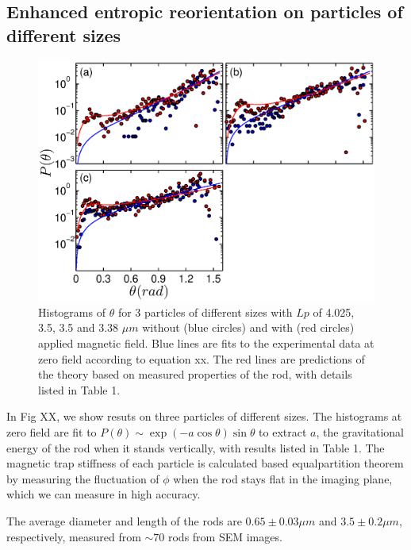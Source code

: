 \documentclass[aps,prl, twocolumn,groupedaddress]{revtex4}
\begin{document}
\subsection*{\normalsize Enhanced entropic reorientation on particles of different sizes}
\begin{figure}[!ht]
\begin{center}
\includegraphics[scale=.45]{Ptheta-allFL.eps}
\renewcommand{\baselinestretch}{1.0}
 \caption{ \small Histograms of $\theta$ for 3 particles of different sizes with $Lp$ of 4.025, 3.5, 3.5 and 3.38 $\mu m$ without (blue circles) and with (red circles) applied magnetic field. Blue lines are fits to the experimental data at zero field according to equation xx. The red lines are predictions of the theory based on measured properties of the rod, with details listed in Table 1. } \label{fig:ptheta}
\end{center}
\vspace{-1\baselineskip}
\end{figure}
In Fig XX, we show resuts on three particles of different sizes. The histograms at zero field are fit to $ P(\theta)\sim \exp(-a\cos \theta )\sin \theta $ to extract $a$, the gravitational energy of the rod when it stands vertically, with results listed in Table 1.  
The magnetic trap stiffness of each particle is calculated based equalpartition theorem by measuring the fluctuation of $\phi$ when the rod stays flat in the imaging plane, which we can measure in high accuracy. 

The average diameter and length of the rods  are $0.65 \pm 0.03 \mu m$ and $3.5 \pm 0.2 \mu m$, respectively, measured from $\sim 70$ rods from SEM images. 
\end{document}
